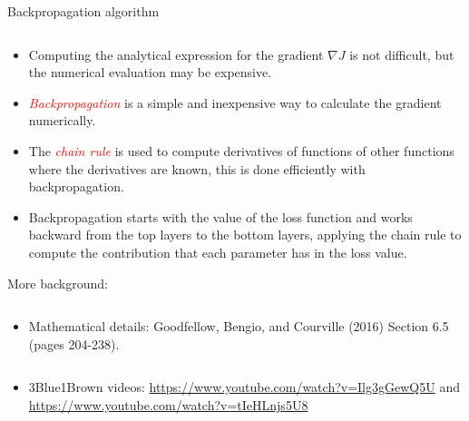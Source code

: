\documentclass[10pt,ignorenonframetext,]{beamer}
\providecommand{\tightlist}{%
  \setlength{\itemsep}{0pt}\setlength{\parskip}{0pt}}
\begin{document}
\begin{frame}

\begin{block}{Backpropagation algorithm}

\(~\)

\begin{itemize}
\tightlist
\item
  Computing the analytical expression for the gradient \(\nabla J\) is
  not difficult, but the numerical evaluation may be expensive.
\end{itemize}

\vspace{2mm}

\begin{itemize}
\tightlist
\item
  \emph{\textcolor{red}{Backpropagation}} is a simple and inexpensive
  way to calculate the gradient numerically.
\end{itemize}

\vspace{2mm}

\begin{itemize}
\tightlist
\item
  The \emph{\textcolor{red}{chain rule}} is used to compute derivatives
  of functions of other functions where the derivatives are known, this
  is done efficiently with backpropagation.
\end{itemize}

\vspace{2mm}

\begin{itemize}
\tightlist
\item
  Backpropagation starts with the value of the loss function and works
  backward from the top layers to the bottom layers, applying the chain
  rule to compute the contribution that each parameter has in the loss
  value.
\end{itemize}

\end{block}

\end{frame}

\begin{frame}

More background:

\(~\)

\begin{itemize}
\tightlist
\item
  Mathematical details: Goodfellow, Bengio, and Courville (2016) Section
  6.5 (pages 204-238).
\end{itemize}

\(~\)

\begin{itemize}
\tightlist
\item
  3Blue1Brown videos: \url{https://www.youtube.com/watch?v=Ilg3gGewQ5U}
  and \url{https://www.youtube.com/watch?v=tIeHLnjs5U8}
\end{itemize}

\end{frame}
\end{document}
